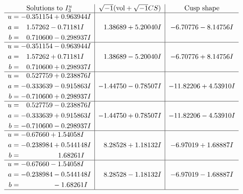 \documentclass[1p]{elsarticle_modified}
\theoremstyle{definition}
\newcommand{\I}{\sqrt{-1}}
\begin{document}
$$\begin{array}{c|c|c}  
\text{Solutions to }I^u_{3}& \I (\text{vol} + \sqrt{-1}CS) & \text{Cusp shape}\\
 \hline 
\begin{aligned}
u &= -0.351154 + 0.963944 I \\
a &= \phantom{-}1.57262 - 0.71181 I \\
b &= \phantom{-}0.710600 - 0.298937 I\end{aligned}
 & \phantom{-}1.38689 + 5.20040 I & -6.70776 - 8.14756 I \\ \hline\begin{aligned}
u &= -0.351154 - 0.963944 I \\
a &= \phantom{-}1.57262 + 0.71181 I \\
b &= \phantom{-}0.710600 + 0.298937 I\end{aligned}
 & \phantom{-}1.38689 - 5.20040 I & -6.70776 + 8.14756 I \\ \hline\begin{aligned}
u &= \phantom{-}0.527759 + 0.238876 I \\
a &= -0.333639 - 0.915863 I \\
b &= -0.710600 + 0.298937 I\end{aligned}
 & -1.44750 - 0.78507 I & -11.82206 + 4.53910 I \\ \hline\begin{aligned}
u &= \phantom{-}0.527759 - 0.238876 I \\
a &= -0.333639 + 0.915863 I \\
b &= -0.710600 - 0.298937 I\end{aligned}
 & -1.44750 + 0.78507 I & -11.82206 - 4.53910 I \\ \hline\begin{aligned}
u &= -0.67660 + 1.54058 I \\
a &= -0.238984 + 0.544148 I \\
b &= \phantom{-0.000000 -}1.68261 I\end{aligned}
 & \phantom{-}8.28528 + 1.18132 I & -6.97019 + 1.68887 I \\ \hline\begin{aligned}
u &= -0.67660 - 1.54058 I \\
a &= -0.238984 - 0.544148 I \\
b &= \phantom{-0.000000 } -1.68261 I\end{aligned}
 & \phantom{-}8.28528 - 1.18132 I & -6.97019 - 1.68887 I\\
 \hline 
 \end{array}$$\newpage\newpage\renewcommand{\arraystretch}{1}
\end{document}
